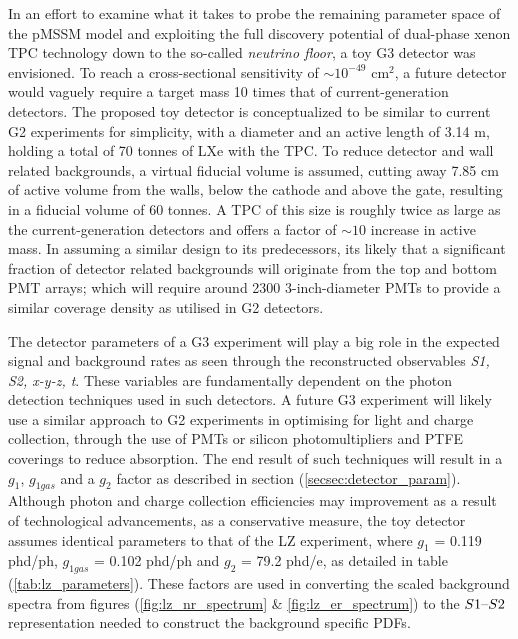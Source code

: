 In an effort to examine what it takes to probe the remaining parameter space of the pMSSM model and exploiting the full discovery potential of dual-phase xenon TPC technology down to the so-called \textit{neutrino floor}, a toy G3 detector was envisioned. To reach a cross-sectional sensitivity of $\sim10^{-49}$ cm$^{2}$, a future detector would vaguely require a target mass 10 times that of current-generation detectors. The proposed toy detector is conceptualized to be similar to current G2 experiments for simplicity, with a diameter and an active length of 3.14 m, holding a total of 70 tonnes of LXe with the TPC. To reduce detector and wall related backgrounds, a virtual fiducial volume is assumed, cutting away 7.85 cm of active volume from the walls, below the cathode and above the gate, resulting in a fiducial volume of 60 tonnes. A TPC of this size is roughly twice as large as the current-generation detectors and offers a factor of $\sim10$ increase in active mass. In assuming a similar design to its predecessors, its likely that a significant fraction of detector related backgrounds will originate from the top and bottom PMT arrays; which will require around 2300 3-inch-diameter PMTs to provide a similar coverage density as utilised in G2 detectors. 

The detector parameters of a G3 experiment will play a big role in the expected signal and background rates as seen through the reconstructed observables \textit{S1, S2, x-y-z, t}. These variables are fundamentally dependent on the photon detection techniques used in such detectors. A future G3 experiment will likely use a similar approach to G2 experiments in optimising for light and charge collection, through the use of PMTs or silicon photomultipliers \cite{Gundacker_2020} and PTFE coverings to reduce absorption. The end result of such techniques will result in a $g_{1}$, $g_{1gas}$ and a $g_{2}$ factor as described in section (\ref{secsec:detector_param}). Although photon and charge collection efficiencies may improvement as a result of technological advancements, as a conservative measure, the toy detector assumes identical parameters to that of the LZ experiment, where $g_{1}$ = 0.119 phd/ph, $g_{1gas}$ = 0.102 phd/ph and $g_{2}$ = 79.2 phd/e, as detailed in table (\ref{tab:lz_parameters}). These factors are used in converting the scaled background spectra from figures (\ref{fig:lz_nr_spectrum} \& \ref{fig:lz_er_spectrum}) to the $S1\text{--}{}S2$ representation needed to construct the background specific PDFs. 


